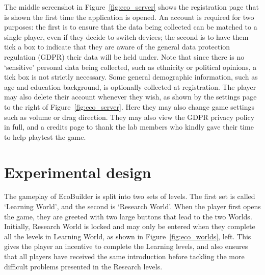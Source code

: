 The middle screenshot in Figure~\ref{fig:eco_server} shows the registration page that is shown the first time the application is opened. An account is required for two purposes: the first is to ensure that the data being collected can be matched to a single player, even if they decide to switch devices; the second is to have them tick a box to indicate that they are aware of the general data protection regulation (GDPR) their data will be held under. Note that since there is no `sensitive' personal data being collected, such as ethnicity or political opinions, a tick box is not strictly necessary.
Some general demographic information, such as age and education background, is optionally collected at registration.
The player may also delete their account whenever they wish, as shown by the settings page to the right of Figure~\ref{fig:eco_server}. Here they may also change game settings such as volume or drag direction. They may also view the GDPR privacy policy in full, and a credits page to thank the lab members who kindly gave their time to help playtest the game.


\section{Experimental design}
\label{sec:eco_hypotheses}
The gameplay of EcoBuilder is split into two sets of levels. The first set is called `Learning World', and the second is `Research World'. 
When the player first opens the game, they are greeted with two large buttons that lead to the two Worlds. Initially, Research World is locked and may only be entered when they complete all the levels in Learning World, as shown in Figure~\ref{fig:eco_worlds}, left. This gives the player an incentive to complete the Learning levels, and also ensures that all players have received the same introduction before tackling the more difficult problems presented in the Research levels.

